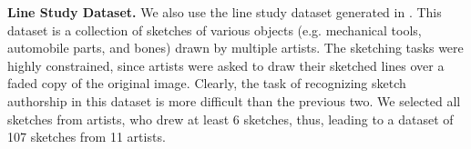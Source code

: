 









\noindent\textbf{Line Study Dataset.} We also use the line study dataset generated in \cite{Cole:2008:PDL:1360612.1360687}. This dataset is a collection of sketches of various objects (e.g. mechanical tools, automobile parts, and bones) drawn by multiple artists. The sketching tasks were highly constrained, since artists were asked to draw their sketched lines over a faded copy of the original image. Clearly, the task of recognizing sketch authorship in this dataset is more difficult than the previous two. We selected all sketches from artists, who drew at least 6 sketches, thus, leading to a dataset of 107 sketches from 11 artists.  %

